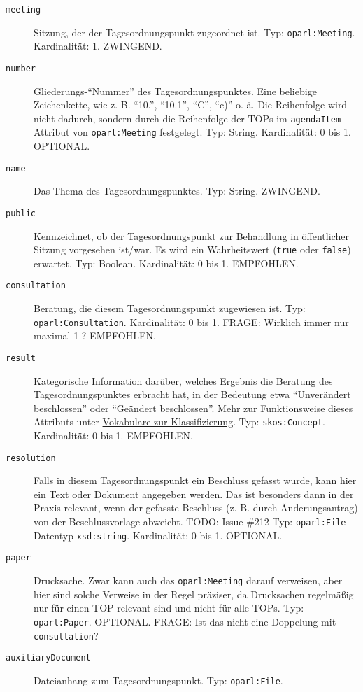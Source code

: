 \documentclass[,a4paper]{article}
\begin{document}
\begin{description}
\item[\texttt{meeting}]
Sitzung, der der Tagesordnungspunkt zugeordnet ist. Typ:
\texttt{oparl:Meeting}. Kardinalität: 1. ZWINGEND.
\item[\texttt{number}]
Gliederungs-``Nummer'' des Tagesordnungspunktes. Eine beliebige
Zeichenkette, wie z. B. ``10.'', ``10.1'', ``C'', ``c)'' o. ä. Die
Reihenfolge wird nicht dadurch, sondern durch die Reihenfolge der TOPs
im \texttt{agendaItem}-Attribut von \texttt{oparl:Meeting} festgelegt.
Typ: String. Kardinalität: 0 bis 1. OPTIONAL.
\item[\texttt{name}]
Das Thema des Tagesordnungspunktes. Typ: String. ZWINGEND.
\item[\texttt{public}]
Kennzeichnet, ob der Tagesordnungspunkt zur Behandlung in öffentlicher
Sitzung vorgesehen ist/war. Es wird ein Wahrheitswert (\texttt{true}
oder \texttt{false}) erwartet. Typ: Boolean. Kardinalität: 0 bis 1.
EMPFOHLEN.
\item[\texttt{consultation}]
Beratung, die diesem Tagesordnungspunkt zugewiesen ist. Typ:
\texttt{oparl:Consultation}. Kardinalität: 0 bis 1. FRAGE: Wirklich
immer nur maximal 1 ? EMPFOHLEN.
\item[\texttt{result}]
Kategorische Information darüber, welches Ergebnis die Beratung des
Tagesordnungspunktes erbracht hat, in der Bedeutung etwa ``Unverändert
beschlossen'' oder ``Geändert beschlossen''. Mehr zur Funktionsweise
dieses Attributs unter
\hyperref[vokabulareux5fklassifizierung]{Vokabulare zur
Klassifizierung}. Typ: \texttt{skos:Concept}. Kardinalität: 0 bis 1.
EMPFOHLEN.
\item[\texttt{resolution}]
Falls in diesem Tagesordnungspunkt ein Beschluss gefasst wurde, kann
hier ein Text oder Dokument angegeben werden. Das ist besonders dann in
der Praxis relevant, wenn der gefasste Beschluss (z. B. durch
Änderungsantrag) von der Beschlussvorlage abweicht. TODO: Issue \#212
Typ: \texttt{oparl:File} \textbar{} Datentyp \texttt{xsd:string}.
Kardinalität: 0 bis 1. OPTIONAL.
\item[\texttt{paper}]
Drucksache. Zwar kann auch das \texttt{oparl:Meeting} darauf verweisen,
aber hier sind solche Verweise in der Regel präziser, da Drucksachen
regelmäßig nur für einen TOP relevant sind und nicht für alle TOPs. Typ:
\texttt{oparl:Paper}. OPTIONAL. FRAGE: Ist das nicht eine Doppelung mit
\texttt{consultation}?
\item[\texttt{auxiliaryDocument}]
Dateianhang zum Tagesordnungspunkt. Typ: \texttt{oparl:File}.

\end{description}
\end{document}
